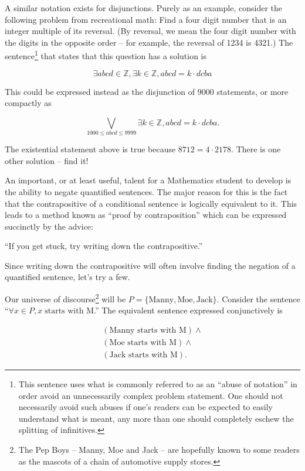 A similar notation exists for disjunctions.  Purely as an example, consider
the following problem from recreational math: Find a four digit number that
is an integer multiple of its reversal.  (By reversal, we mean the four
digit number with the digits in the opposite order -- for example, the
reversal of 1234 is 4321.)  The sentence\footnote{This sentence uses what %
is commonly referred to as an ``abuse of notation'' in order avoid an %
unnecessarily complex problem statement.  One should not necessarily %
avoid such abuses if one's readers can be expected to easily understand %
what is meant, any more than one should completely eschew the splitting %
of infinitives.}
that states that this question has a solution is

\[
\exists abcd \in {\mathbb Z},  \exists k \in {\mathbb Z}, abcd = k\cdot dcba
\]

This could be expressed instead as the disjunction of 9000 statements, or more 
compactly as

\[
\bigvee_{1000\leq abcd \leq 9999}  \exists k \in {\mathbb Z}, abcd = k\cdot dcba.
\]

\begin{exer} The existential statement above is true because $8712 = 4\cdot 2178$.
There is one other solution -- find it!
\end{exer}

An important, or at least useful, talent for a Mathematics student to develop
is the ability to negate quantified sentences.  The major reason for this
is the fact that the contrapositive of a conditional sentence is logically
equivalent to it.  This leads to a method known as 
``proof by contraposition''
which can be expressed succinctly by the advice:

``If you get stuck, try writing down the contrapositive.''

Since writing down the contrapositive will often involve finding the
negation of a quantified sentence, let's try a few.

Our universe of discourse\footnote{The Pep Boys -- Manny, Moe and %
Jack -- are hopefully known to some readers as the mascots of a chain %
of automotive supply stores.} 
will be $P = \{ \mbox{Manny}, \mbox{Moe}, \mbox{Jack} \}$.  
Consider the sentence 
``$\forall x \in P, x\; \mbox{starts with M}$.''   The equivalent sentence
expressed conjunctively is 

\begin{gather*} (\mbox{Manny starts with M}) \land \\
(\mbox{Moe starts with M}) \land \\
(\mbox{Jack starts with M}).
\end{gather*}

